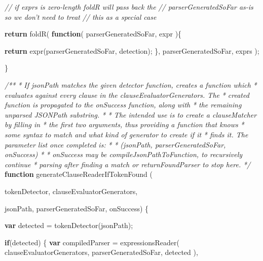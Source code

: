 \documentclass[12pt, ]{article}
\newenvironment{Shaded}{}{}
\newcommand{\KeywordTok}[1]{\textcolor[rgb]{0.00,0.44,0.13}{\textbf{{#1}}}}
\newcommand{\CommentTok}[1]{\textcolor[rgb]{0.38,0.63,0.69}{\textit{{#1}}}}
\newcommand{\FunctionTok}[1]{\textcolor[rgb]{0.02,0.16,0.49}{{#1}}}
\newcommand{\NormalTok}[1]{{#1}}
\begin{document}
\begin{Shaded}
\begin{Highlighting}[]
      \CommentTok{// if exprs is zero-length foldR will pass back the }
      \CommentTok{// parserGeneratedSoFar as-is so we don't need to treat }
      \CommentTok{// this as a special case}
      
      \KeywordTok{return}   \FunctionTok{foldR}\NormalTok{( }
                  \KeywordTok{function}\NormalTok{( parserGeneratedSoFar, expr )\{}
         
                     \KeywordTok{return} \FunctionTok{expr}\NormalTok{(parserGeneratedSoFar, detection);}
                  \NormalTok{\}, }
                  \NormalTok{parserGeneratedSoFar, }
                  \NormalTok{exprs}
               \NormalTok{);                     }

   \NormalTok{\}}

   \CommentTok{/** }
\CommentTok{    *  If jsonPath matches the given detector function, creates a function which}
\CommentTok{    *  evaluates against every clause in the clauseEvaluatorGenerators. The}
\CommentTok{    *  created function is propagated to the onSuccess function, along with}
\CommentTok{    *  the remaining unparsed JSONPath substring.}
\CommentTok{    *  }
\CommentTok{    *  The intended use is to create a clauseMatcher by filling in}
\CommentTok{    *  the first two arguments, thus providing a function that knows}
\CommentTok{    *  some syntax to match and what kind of generator to create if it}
\CommentTok{    *  finds it. The parameter list once completed is:}
\CommentTok{    *  }
\CommentTok{    *    (jsonPath, parserGeneratedSoFar, onSuccess)}
\CommentTok{    *  }
\CommentTok{    *  onSuccess may be compileJsonPathToFunction, to recursively continue }
\CommentTok{    *  parsing after finding a match or returnFoundParser to stop here.}
\CommentTok{    */}
   \KeywordTok{function} \FunctionTok{generateClauseReaderIfTokenFound} \NormalTok{(}
     
                        \NormalTok{tokenDetector, clauseEvaluatorGenerators,}
                         
                        \NormalTok{jsonPath, parserGeneratedSoFar, onSuccess) \{}
                        
      \KeywordTok{var} \NormalTok{detected = }\FunctionTok{tokenDetector}\NormalTok{(jsonPath);}

      \KeywordTok{if}\NormalTok{(detected) \{}
         \KeywordTok{var} \NormalTok{compiledParser = }\FunctionTok{expressionsReader}\NormalTok{(}
                                 \NormalTok{clauseEvaluatorGenerators, }
                                 \NormalTok{parserGeneratedSoFar, }
                                 \NormalTok{detected}
                              \NormalTok{),}
         

\end{Highlighting}
\end{Shaded}
\end{document}
